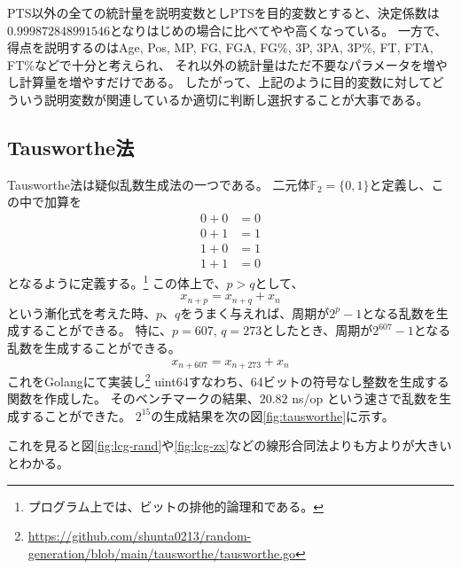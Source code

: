 \documentclass[../../../main]{subfiles}
\begin{document}
PTS以外の全ての統計量を説明変数としPTSを目的変数とすると、決定係数は$0.999872848991546$となりはじめの場合に比べてやや高くなっている。
一方で、得点を説明するのはAge, Pos, MP, FG, FGA, FG\%, 3P, 3PA, 3P\%, FT, FTA, FT\%などで十分と考えられ、
それ以外の統計量はただ不要なパラメータを増やし計算量を増やすだけである。
したがって、上記のように目的変数に対してどういう説明変数が関連しているか適切に判断し選択することが大事である。

\subsection{Tausworthe法}
Tausworthe法は疑似乱数生成法の一つである。
二元体$\mathbb{F}_2 = \{0, 1\}$と定義し、この中で加算を
\begin{align*}
	0 + 0 & = 0 \\
	0 + 1 & = 1 \\
	1 + 0 & = 1 \\
	1 + 1 & = 0
\end{align*}
となるように定義する。\footnote{
	プログラム上では、ビットの排他的論理和である。
}
この体上で、$p>q$として、
\begin{equation}
	x_{n+p} = x_{n+q} + x_n
\end{equation}
という漸化式を考えた時、$p$、$q$をうまく与えれば、周期が$2^p - 1$となる乱数を生成することができる。
特に、$p=607$, $q=273$としたとき、周期が$2^{607} - 1$となる乱数を生成することができる。\cite{makoto-matsumoto}
\begin{equation}
	x_{n+607} = x_{n+273} + x_n
\end{equation}
これをGolangにて実装し\footnote{
	\url{https://github.com/shunta0213/random-generation/blob/main/tausworthe/tausworthe.go}
}
uint64すなわち、64ビットの符号なし整数を生成する関数を作成した。
そのベンチマークの結果、$20.82$ ns/op という速さで乱数を生成することができた。
$2^{15}$の生成結果を次の図\ref{fig:tausworthe}に示す。

これを見ると図\ref{fig:lcg-rand}や\ref{fig:lcg-zx}などの線形合同法よりも方よりが大きいとわかる。
\end{document}
